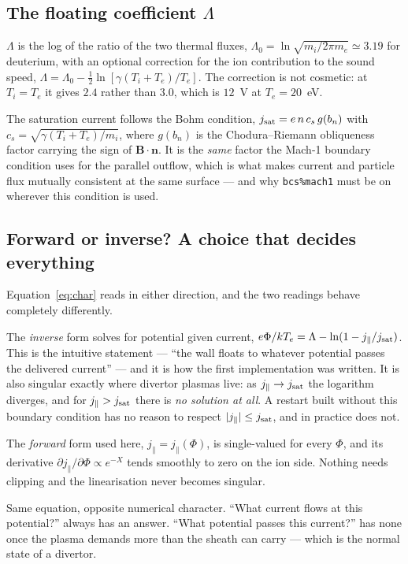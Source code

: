 \documentclass[11pt,a4paper]{article}
\newcommand{\code}[1]{\texttt{\small #1}}
\begin{document}
\subsection{The floating coefficient $\Lambda$}

$\Lambda$ is the log of the ratio of the two thermal fluxes,
$\Lambda_0=\ln\sqrt{m_i/2\pi m_e}\simeq3.19$ for deuterium, with an optional correction for the ion
contribution to the sound speed, $\Lambda=\Lambda_0-\tfrac12\ln[\gamma(T_i+T_e)/T_e]$. The correction
is not cosmetic: at $T_i=T_e$ it gives $2.4$ rather than $3.0$, which is $12$~V at $T_e=20$~eV.

The saturation current follows the Bohm condition,
$j_{\rm sat}=e\,n\,c_s\,g(b_n)$ with $c_s=\sqrt{\gamma(T_i+T_e)/m_i}$, where $g(b_n)$ is the
Chodura--Riemann obliqueness factor carrying the sign of $\bm{B}\!\cdot\!\bm{n}$. It is the
\emph{same} factor the Mach-1 boundary condition uses for the parallel outflow, which is what makes
current and particle flux mutually consistent at the same surface --- and why \code{bcs\%mach1} must
be on wherever this condition is used.

\subsection{Forward or inverse? A choice that decides everything}

Equation~\eqref{eq:char} reads in either direction, and the two readings behave completely
differently.

The \emph{inverse} form solves for potential given current,
$e\Phi/kT_e = \Lambda-\ln(1-j_\parallel/j_{\rm sat})$. This is the intuitive statement --- ``the wall
floats to whatever potential passes the delivered current'' --- and it is how the first
implementation was written. It is also singular exactly where divertor plasmas live: as
$j_\parallel\to j_{\rm sat}$ the logarithm diverges, and for $j_\parallel>j_{\rm sat}$ there is
\emph{no solution at all}. A restart built without this boundary condition has no reason to respect
$|j_\parallel|\le j_{\rm sat}$, and in practice does not.

The \emph{forward} form used here, $j_\parallel=j_\parallel(\Phi)$, is single-valued for every $\Phi$,
and its derivative $\partial j_\parallel/\partial\Phi\propto e^{-X}$ tends smoothly to zero on the ion
side. Nothing needs clipping and the linearisation never becomes singular.

\begin{plain}
Same equation, opposite numerical character. ``What current flows at this potential?'' always has an
answer. ``What potential passes this current?'' has none once the plasma demands more than the sheath
can carry --- which is the normal state of a divertor.
\end{plain}
\end{document}
